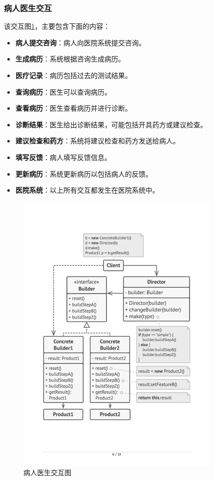 \subsubsection{病人医生交互}
该交互图\ref{bingren}，主要包含下面的内容：
\begin{itemize}
	\item \textbf{病人提交咨询}：病人向医院系统提交咨询。
	\item \textbf{生成病历}：系统根据咨询生成病历。
	\item \textbf{医疗记录}：病历包括过去的测试结果。
	\item \textbf{查询病历}：医生可以查询病历。
	\item \textbf{查看病历}：医生查看病历并进行诊断。
	\item \textbf{诊断结果}：医生给出诊断结果，可能包括开具药方或建议检查。
	\item \textbf{建议检查和药方}：系统将建议检查和药方发送给病人。
	\item \textbf{填写反馈}：病人填写反馈信息。
	\item \textbf{更新病历}：系统更新病历以包括病人的反馈。
	\item \textbf{医院系统}：以上所有交互都发生在医院系统中。
\end{itemize}
\begin{figure}[htbp]
	\centering
	\includegraphics[width=0.9\textwidth]{figures/03.pdf}
	\caption{病人医生交互图}\label{bingren}
\end{figure}